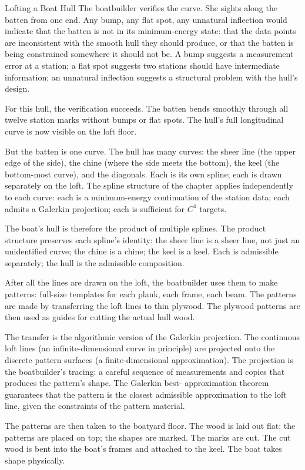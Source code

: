 \begin{coda}{Lofting a Boat Hull}
The boatbuilder verifies the curve. She sights along the batten from
one end. Any bump, any flat spot, any unnatural inflection would
indicate that the batten is not in its minimum-energy state: that
the data points are inconsistent with the smooth hull they should
produce, or that the batten is being constrained somewhere it
should not be. A bump suggests a measurement error at a station;
a flat spot suggests two stations should have intermediate
information; an unnatural inflection suggests a structural problem
with the hull's design.

For this hull, the verification succeeds. The batten bends smoothly
through all twelve station marks without bumps or flat spots. The
hull's full longitudinal curve is now visible on the loft floor.

But the batten is one curve. The hull has many curves: the sheer
line (the upper edge of the side), the chine (where the side meets
the bottom), the keel (the bottom-most curve), and the diagonals.
Each is its own spline; each is drawn separately on the loft. The
spline structure of the chapter applies independently to each curve:
each is a minimum-energy continuation of the station data; each
admits a Galerkin projection; each is sufficient for $C^4$ targets.

The boat's hull is therefore the product of multiple splines. The
product structure preserves each spline's identity: the sheer line
is a sheer line, not just an unidentified curve; the chine is a
chine; the keel is a keel. Each is admissible separately; the hull
is the admissible composition.

After all the lines are drawn on the loft, the boatbuilder uses
them to make patterns: full-size templates for each plank, each
frame, each beam. The patterns are made by transferring the loft
lines to thin plywood. The plywood patterns are then used as
guides for cutting the actual hull wood.

The transfer is the algorithmic version of the Galerkin projection.
The continuous loft lines (an infinite-dimensional curve in
principle) are projected onto the discrete pattern surfaces (a
finite-dimensional approximation). The projection is the
boatbuilder's tracing: a careful sequence of measurements and
copies that produces the pattern's shape. The Galerkin best-
approximation theorem guarantees that the pattern is the closest
admissible approximation to the loft line, given the constraints
of the pattern material.

The patterns are then taken to the boatyard floor. The wood is laid
out flat; the patterns are placed on top; the shapes are marked.
The marks are cut. The cut wood is bent into the boat's frames and
attached to the keel. The boat takes shape physically.


\end{coda}
